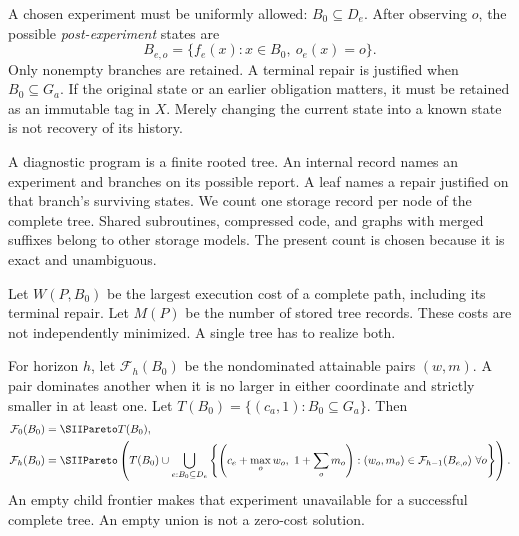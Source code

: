 A chosen experiment must be uniformly allowed: $B_0\subseteq D_e$. After observing $o$, the possible \emph{post-experiment} states are
\begin{equation}\label{SII:eq:post}
B_{e,o}=\{f_e(x):x\in B_0,\ o_e(x)=o\}.
\end{equation}
Only nonempty branches are retained. A terminal repair is justified when $B_0\subseteq G_a$. If the original state or an earlier obligation matters, it must be retained as an immutable tag in $X$. Merely changing the current state into a known state is not recovery of its history.

A diagnostic program is a finite rooted tree. An internal record names an experiment and branches on its possible report. A leaf names a repair justified on that branch's surviving states. We count one storage record per node of the complete tree. Shared subroutines, compressed code, and graphs with merged suffixes belong to other storage models. The present count is chosen because it is exact and unambiguous.

Let $W(P,B_0)$ be the largest execution cost of a complete path, including its terminal repair. Let $M(P)$ be the number of stored tree records. These costs are not independently minimized. A single tree has to realize both.

For horizon $h$, let $\mathcal F_h(B_0)$ be the nondominated attainable pairs $(w,m)$. A pair dominates another when it is no larger in either coordinate and strictly smaller in at least one. Let $T(B_0)=\{(c_a,1):B_0\subseteq G_a\}$. Then
\begin{align}\label{SII:eq:pareto}
\mathcal F_0(B_0)&=\SIIPareto T(B_0),\\
\mathcal F_h(B_0)&=\SIIPareto\left(T(B_0)\cup
\bigcup_{e:B_0\subseteq D_e}
\left\{\left(c_e+\max_o w_o,\ 1+\sum_o m_o\right):
(w_o,m_o)\in\mathcal F_{h-1}(B_{e,o})\ \forall o\right\}\right).
\nonumber
\end{align}
An empty child frontier makes that experiment unavailable for a successful complete tree. An empty union is not a zero-cost solution.


